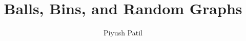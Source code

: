 \documentclass{article}
\begin{document}
\title{Balls, Bins, and Random Graphs}
\author{Piyush Patil}
\maketitle
\end{document}
